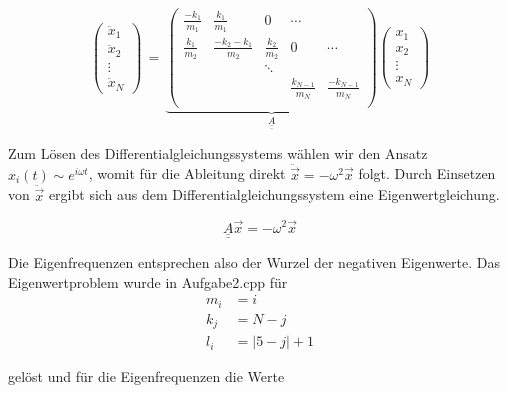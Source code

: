 \begin{equation*}
  \left(\begin{array}{c} \ddot{x}_1 \\ \ddot{x}_2 \\ \vdots \\ \ddot{x}_N \end{array}\right)\, = \,
  \underbrace{\left(
        \begin{array}{ccccc}
          \frac{-k_1}{m_1} & \frac{k_1}{m_1} & 0 & \cdots & \\
          \frac{k_1}{m_2} & \frac{-k_2-k_1}{m_2} & \frac{k_2}{m_2} & 0 & \cdots \\
          & & \ddots & & \\
          & & & \frac{k_{N-1}}{m_N} & \frac{-k_{N-1}}{m_N}\\
        \end{array}\right)}_{\underline{\underline{A}}}
        \left(\begin{array}{c} x_1 \\ x_2 \\ \vdots \\ x_N \end{array}\right)
\end{equation*}

Zum Lösen des Differentialgleichungssystems wählen wir den Ansatz $x_i(t) \sim e^{i\omega t}$, womit für die Ableitung direkt $\ddot{\vec{x}} = -\omega^2 \vec{x}$ folgt. Durch Einsetzen von $\ddot{\vec{x}}$ ergibt sich aus dem Differentialgleichungssystem eine Eigenwertgleichung.

\begin{equation*}
  \underline{\underline{A}}\vec{x} = -\omega^2\vec{x}
\end{equation*}

\noindent
Die Eigenfrequenzen entsprechen also der Wurzel der negativen Eigenwerte. Das Eigenwertproblem wurde in Aufgabe2.cpp für
\begin{align*}
  m_i &= i \\
  k_j &= N-j \\
  l_i &= |5-j|+1
\end{align*}

\noindent
gelöst und für die Eigenfrequenzen die Werte

